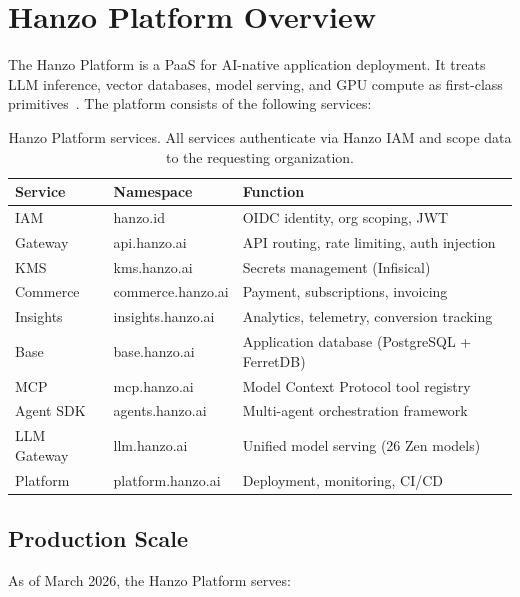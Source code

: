 \documentclass[11pt]{article}
\begin{document}
\section{Hanzo Platform Overview}
\label{sec:platform}

The Hanzo Platform is a PaaS for AI-native application deployment. It treats LLM
inference, vector databases, model serving, and GPU compute as first-class
primitives~\cite{hanzoplatform}. The platform consists of the following services:

\begin{table}[H]
\centering
\small
\begin{tabular}{llp{5.5cm}}
\toprule
\textbf{Service} & \textbf{Namespace} & \textbf{Function} \\
\midrule
IAM & hanzo.id & OIDC identity, org scoping, JWT \\
Gateway & api.hanzo.ai & API routing, rate limiting, auth injection \\
KMS & kms.hanzo.ai & Secrets management (Infisical) \\
Commerce & commerce.hanzo.ai & Payment, subscriptions, invoicing \\
Insights & insights.hanzo.ai & Analytics, telemetry, conversion tracking \\
Base & base.hanzo.ai & Application database (PostgreSQL + FerretDB) \\
MCP & mcp.hanzo.ai & Model Context Protocol tool registry \\
Agent SDK & agents.hanzo.ai & Multi-agent orchestration framework \\
LLM Gateway & llm.hanzo.ai & Unified model serving (26 Zen models) \\
Platform & platform.hanzo.ai & Deployment, monitoring, CI/CD \\
\bottomrule
\end{tabular}
\caption{Hanzo Platform services. All services authenticate via Hanzo IAM and scope data to the requesting organization.}
\label{tab:services}
\end{table}

\subsection{Production Scale}

As of March 2026, the Hanzo Platform serves:
\end{document}
